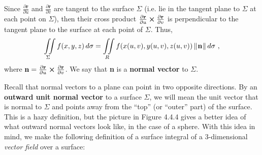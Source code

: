 Since $\frac{\partial \textbf{r}}{\partial u}$ and $\frac{\partial \textbf{r}}{\partial v}$ are tangent to the surface
$\Sigma$ (i.e. lie in the tangent plane to $\Sigma$ at each point on $\Sigma$), then their cross product
$\frac{\partial \textbf{r}}{\partial u} \bm{\times} \frac{\partial \textbf{r}}{\partial v}$ is perpendicular to the
tangent plane to the surface at each point of $\Sigma$. Thus,
\newpage
\begin{displaymath}
 \iint\limits_{\Sigma} f(x,y,z)\,d\sigma = \iint\limits_{R} f(x(u,v),y(u,v),z(u,v))\,\lVert\mspace{1mu}\textbf{n}\mspace{1mu}\rVert\,d\sigma ~,
\end{displaymath}
where $\textbf{n} = \frac{\partial \textbf{r}}{\partial u} \bm{\times} \frac{\partial \textbf{r}}{\partial v}$.
We say that \textbf{n} is a \textbf{normal vector} to $\Sigma$.

\piccaption[]{}
Recall that normal vectors to a plane can point in two opposite directions. By an
\textbf{outward unit normal vector} to a surface $\Sigma$, we will mean the unit vector that is normal to $\Sigma$ and
points away from the ``top'' (or ``outer'' part) of the surface. This is a hazy definition, but the picture in
Figure 4.4.4 gives a better idea of what outward normal vectors look like, in the case of a sphere.
With this idea in mind, we make the following definition of a surface integral of a 3-dimensional
\emph{vector field} over a surface:

